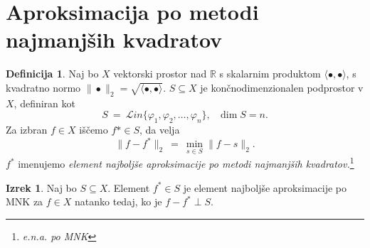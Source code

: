 \documentclass[11pt]{article}
\newcommand{\R}{\mathbb{R}}
\theoremstyle{definition}
\newtheorem{definicija}{Definicija}[section]
\theoremstyle{definition}
\newtheorem{izrek}{Izrek}
\begin{document}
\pagebreak


\section{Aproksimacija po metodi najmanjših kvadratov}
\vspace{0.5cm}

\begin{definicija}

Naj bo $X$ vektorski prostor nad $\R$ s skalarnim produktom $\langle \bullet, \bullet \rangle$, s kvadratno normo $\|\bullet\|_2 = \sqrt{\langle \bullet, \bullet \rangle}$. $S \subseteq X$ je končnodimenzionalen podprostor v $X$, definiran kot
$$S ~=~ \mathcal{L}\textit{in}\{\varphi_1, \varphi_2, \ldots, \varphi_n\}, ~~~\dim{S} = n.$$
Za izbran $f \in X$ iščemo $f* \in S$, da velja
$$\|f - f^*\|_2 ~=~ \min_{s \in S}\|f - s\|_2.$$
$f^*$ imenujemo \textit{element najboljše aproksimacije po metodi najmanjših kvadratov.}\footnote{\textit{e.n.a. po MNK}}

\end{definicija}
\vspace{0.5cm}

\begin{izrek}

Naj bo $S \subseteq X.$ Element $f^* \in S$ je element najboljše aproksimacije po MNK za $f \in X$ natanko tedaj, ko je $f - f^* \perp S$.

\end{izrek}
\vspace{0.5cm}
\end{document}
